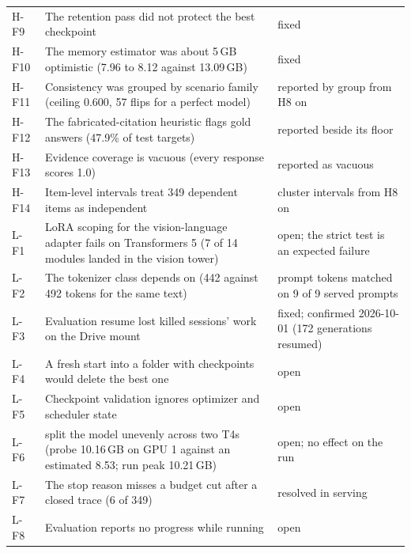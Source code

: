 \begin{table}[H]
\begin{tabular}{L{10mm}L{92mm}L{50mm}}
H-F9 & The retention pass did not protect the best checkpoint & fixed \\
H-F10 & The memory estimator was about 5\,GB optimistic (7.96 to 8.12 against 13.09\,GB) & fixed \\
H-F11 & Consistency was grouped by scenario family (ceiling 0.600, 57 flips for a perfect model) & reported by group from H8 on \\
H-F12 & The fabricated-citation heuristic flags gold answers (47.9\% of test targets) & reported beside its floor \\
H-F13 & Evidence coverage is vacuous (every response scores 1.0) & reported as vacuous \\
H-F14 & Item-level intervals treat 349 dependent items as independent & cluster intervals from H8 on \\
\midrule
L-F1 & LoRA scoping for the vision-language adapter fails on Transformers 5 (7 of 14 modules landed in the vision tower) & open; the strict test is an expected failure \\
L-F2 & The tokenizer class depends on  (442 against 492 tokens for the same text) & prompt tokens matched on 9 of 9 served prompts \\
L-F3 & Evaluation resume lost killed sessions' work on the Drive mount & fixed; confirmed 2026-10-01 (172 generations resumed) \\
L-F4 & A fresh start into a folder with checkpoints would delete the best one & open \\
L-F5 & Checkpoint validation ignores optimizer and scheduler state & open \\
L-F6 &  split the model unevenly across two T4s (probe 10.16\,GB on GPU 1 against an estimated 8.53; run peak 10.21\,GB) & open; no effect on the run \\
L-F7 & The stop reason misses a budget cut after a closed trace (6 of 349) & resolved in serving \\
L-F8 & Evaluation reports no progress while running & open \\
\bottomrule
\end{tabular}
\end{table}

